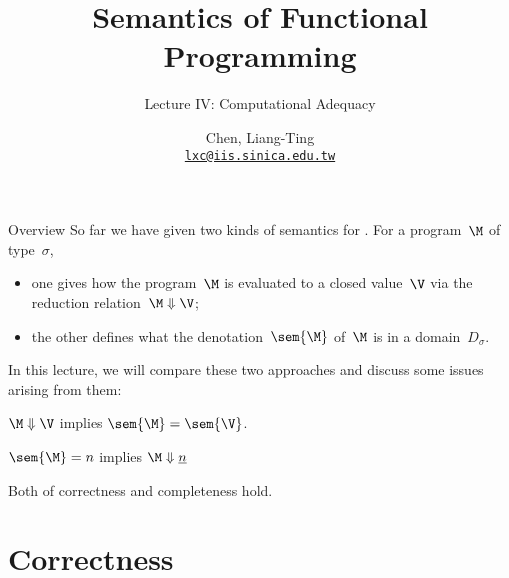 \title{Semantics of Functional Programming}
\subtitle{Lecture IV: Computational Adequacy}
\author[L.-T. Chen]{Chen, Liang-Ting\\
  \href{mailto:lxc@iis.sinica.edu.tw}{\texttt{lxc@iis.sinica.edu.tw}}}

\frame{\maketitle}

\begin{frame}{Overview}
  So far we have given two kinds of semantics for \PCF{}. For a program~$\M$ of
  type~$\sigma$,
  \begin{itemize}
    \item one gives how the program~$\M$ is evaluated to a closed value~$\V$
      via the reduction relation~$\M \Downarrow\V$;
    \item the other defines what the denotation~$\sem{\M}$ of~$\M$ is in a
      domain~$D_\sigma$. 
    \end{itemize}
  In this lecture, we will compare these two approaches and discuss some issues
  arising from them:
  \begin{description}
    \item[Correctness] $\M \Downarrow \V$ implies $\sem{\M} = \sem{\V}$.
    \item[Completeness] $\sem{\M} = n$ implies $\M \Downarrow \underline{n}$
    \item[Computational adequacy]
      Both of correctness and completeness hold. 
  \end{description}

\end{frame}

\section{Correctness}


